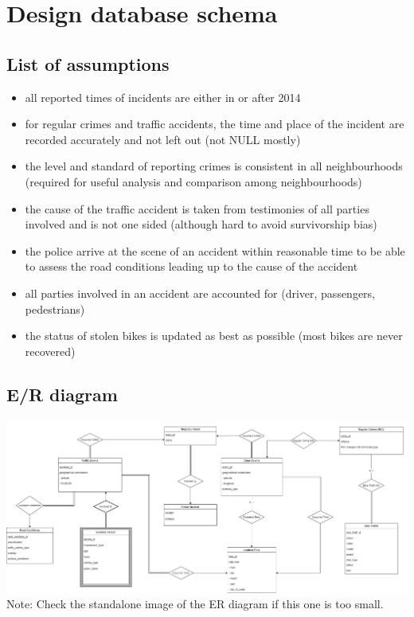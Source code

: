 \documentclass[12pt, a4paper]{article}
\begin{document}
\section*{Design database schema}
\subsection*{List of assumptions}
\begin{itemize}
    \item all reported times of incidents are either in or after 2014
    \item for regular crimes and traffic accidents, the time and place of the incident are recorded accurately and not left out (not NULL mostly)
    \item the level and standard of reporting crimes is consistent in all neighbourhoods (required for useful analysis and comparison among neighbourhoods)
    \item the cause of the traffic accident is taken from testimonies of all parties involved and is not one sided (although hard to avoid survivorship bias)
    \item the police arrive at the scene of an accident within reasonable time to be able to assess the road conditions leading up to the cause of the accident
    \item all parties involved in an accident are accounted for (driver, passengers, pedestrians)
    \item the status of stolen bikes is updated as best as possible (most bikes are never recovered)
\end{itemize}
\subsection*{E/R diagram}
\includegraphics[scale=0.25]{ER Diagram.png}
Note: Check the standalone image of the ER diagram if this one is too small.
\end{document}
